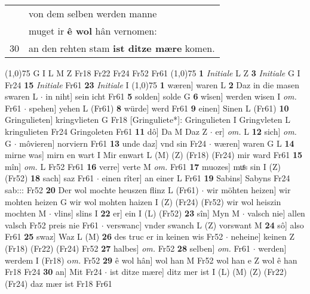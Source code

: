 \documentclass[8pt,a4paper,notitlepage]{article}
\begin{document}
\begin{table}[ht]
\begin{minipage}[t]{0.5\linewidth}
\begin{tabular}{rl}
 & von dem selben werden manne\\ 
 & muget ir \textbf{ê wol} hân vernomen:\\ 
30 & an den rehten stam \textbf{ist ditze mære} komen.\\ 
\end{tabular}
\scriptsize
\line(1,0){75} \newline
G I L M Z Fr18 Fr22 Fr24 Fr52 Fr61 \newline
\line(1,0){75} \newline
\textbf{1} \textit{Initiale} L Z  \textbf{3} \textit{Initiale} G I Fr24  \textbf{15} \textit{Initiale} Fr61  \textbf{23} \textit{Initiale} I  \newline
\line(1,0){75} \newline
\textbf{1} wæren] waren L \textbf{2} Daz in die masen swaren L  $\cdot$ in niht] sein icht Fr61 \textbf{5} solden] solde G \textbf{6} wîsen] werden wisen I \textit{om.} Fr61  $\cdot$ spehen] yehen L (Fr61) \textbf{8} würde] werd Fr61 \textbf{9} einen] Sinen L (Fr61) \textbf{10} Gringulieten] kringvlieten G Fr18 [Gringuliete*]: Gringulieten I Gringvleten L kringulieten Fr24 Gringoleten Fr61 \textbf{11} dô] Da M Daz Z  $\cdot$ er] \textit{om.} L \textbf{12} sich] \textit{om.} G  $\cdot$ môvieren] norviern Fr61 \textbf{13} unde daz] vnd sin Fr24  $\cdot$ wæren] waren G L \textbf{14} mirne was] mirn en wart I Mir enwart L (M) (Z) (Fr18) (Fr24) mir ward Fr61 \textbf{15} mîn] \textit{om.} L Fr52 Fr61 \textbf{16} verre] verte M \textit{om.} Fr61 \textbf{17} muozes] muͤs sin I (Z) (Fr52) \textbf{18} sach] saz Fr61  $\cdot$ einen rîter] an einer L Fr61 \textbf{19} Sabins] Sabyns Fr24 sab::: Fr52 \textbf{20} Der wol mochte heuszen flinz L (Fr61)  $\cdot$ wir möhten heizen] wir mohten heizen G wir wol mohten haizen I (Z) (Fr24) (Fr52) wir wol heiszin mochten M  $\cdot$ vlins] slins I \textbf{22} er] ein I (L) (Fr52) \textbf{23} sîn] Myn M  $\cdot$ valsch nie] allen valsch Fr52 preis nie Fr61  $\cdot$ verswanc] vnder swanch L (Z) vorswant M \textbf{24} sô] also Fr61 \textbf{25} swaz] Waz L (M) \textbf{26} des truc er in keinen wis Fr52  $\cdot$ neheine] keinen Z (Fr18) (Fr22) (Fr24) Fr52 \textbf{27} halbes] \textit{om.} Fr52 \textbf{28} selben] \textit{om.} Fr61  $\cdot$ werden] werdem I (Fr18) o\textit{m. } Fr52 \textbf{29} ê wol hân] wol han M Fr52 wol han e Z wol ê han Fr18 Fr24 \textbf{30} an] Mit Fr24  $\cdot$ ist ditze mære] ditz mer ist I (L) (M) (Z) (Fr22) (Fr24) daz mær ist Fr18 Fr61 \newline
\end{minipage}

\end{table}
\end{document}
